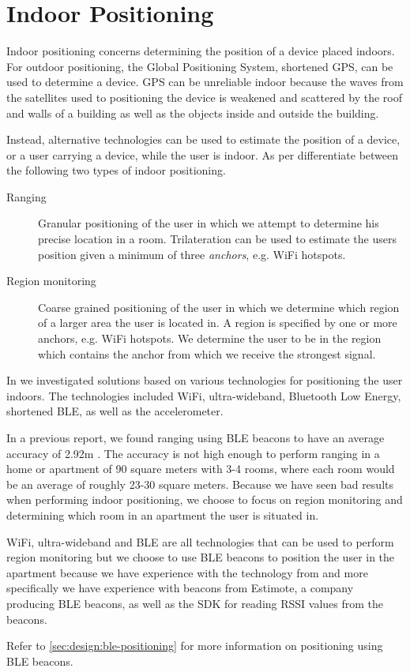\section{Indoor Positioning}
\label{sec:analysis:indoor-positioning}

Indoor positioning concerns determining the position of a device placed indoors. For outdoor positioning, the Global Positioning System, shortened GPS, can be used to determine a device. GPS can be unreliable indoor because the waves from the satellites used to positioning the device is weakened and scattered by the roof and walls of a building as well as the objects inside and outside the building.

Instead, alternative technologies can be used to estimate the position of a device, or a user carrying a device, while the user is indoor. As per \cite{prespecialisation} differentiate between the following two types of indoor positioning.

\begin{description}
\item[Ranging] Granular positioning of the user in which we attempt to determine his precise location in a room. Trilateration can be used to estimate the users position given a minimum of three \emph{anchors}, e.g. WiFi hotspots.
\item[Region monitoring] Coarse grained positioning of the user in which we determine which region of a larger area the user is located in. A region is specified by one or more anchors, e.g. WiFi hotspots. We determine the user to be in the region which contains the anchor from which we receive the strongest signal.
\end{description}

In \cite{prespecialisation} we investigated solutions based on various technologies for positioning the user indoors. The technologies included WiFi, ultra-wideband, Bluetooth Low Energy, shortened BLE, as well as the accelerometer.

In a previous report, we found ranging using BLE beacons to have an average accuracy of 2.92m \cite[p. 63]{prespecialisation}. The accuracy is not high enough to perform ranging in a home or apartment of 90 square meters with 3-4 rooms, where each room would be an average of roughly 23-30 square meters. Because we have seen bad results when performing indoor positioning, we choose to focus on region monitoring and determining which room in an apartment the user is situated in.

WiFi, ultra-wideband and BLE are all technologies that can be used to perform region monitoring but we choose to use BLE beacons to position the user in the apartment because we have experience with the technology from \cite{prespecialisation} and more specifically we have experience with beacons from Estimote, a company producing BLE beacons, as well as the SDK for reading RSSI values from the beacons.

Refer to \cref{sec:design:ble-positioning} for more information on positioning using BLE beacons.

